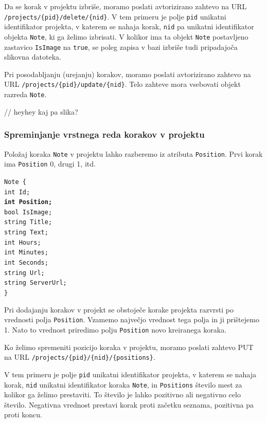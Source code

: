 \documentclass[a4paper, 12pt]{book}
\begin{document}
Da se korak v projektu izbriše, moramo poslati avtorizirano zahtevo na URL \texttt{/projects/\{pid\}/delete/\{nid\}}.
V tem primeru je polje \texttt{pid} unikatni identifikator projekta, v katerem se nahaja korak, \texttt{nid} pa unikatni identifikator objekta \texttt{Note}, ki ga želimo izbrisati.
V kolikor ima ta objekt \texttt{Note} postavljeno zastavico \texttt{IsImage} na \texttt{true}, se poleg zapisa v bazi izbriše tudi pripadajoča slikovna datoteka.

Pri posodabljanju (urejanju) korakov, moramo poslati avtorizirano zahtevo na URL \texttt{/projects/\{pid\}/update/\{nid\}}.
Telo zahteve mora vsebovati objekt razreda \texttt{Note}.

// heyhey kaj pa slika?

\subsubsection{Spreminjanje vrstnega reda korakov v projektu}

Položaj koraka \texttt{Note} v projektu lahko razberemo iz atributa \texttt{Position}.
Prvi korak ima \texttt{Position} 0, drugi 1, itd.

\noindent \texttt{Note \{ \\
int Id; \\
\textbf{int Position;} \\
bool IsImage;  \\
string Title; \\
string Text; \\
int Hours; \\
int Minutes; \\
int Seconds; \\
string Url; \\
string ServerUrl; \\
\}
}

Pri dodajanju korakov v projekt se obstoječe korake projekta razvrsti po vrednosti polja \texttt{Position}.
Vzamemo največjo vrednost tega polja in ji prištejemo 1.
Nato to vrednost priredimo polju \texttt{Position} novo kreiranega koraka.

Ko želimo spremeniti pozicijo koraka v projektu, moramo poslati zahtevo PUT na URL \texttt{/projects/\{pid\}/\{nid\}/\{positions\}}.

V tem primeru je polje \texttt{pid} unikatni identifikator projekta, v katerem se nahaja korak, \texttt{nid} unikatni identifikator koraka \texttt{Note}, in \texttt{Positions} število mest za kolikor ga želimo prestaviti.
To število je lahko pozitivno ali negativno celo število.
Negativna vrednost prestavi korak proti začetku seznama, pozitivna pa proti koncu.
\end{document}
